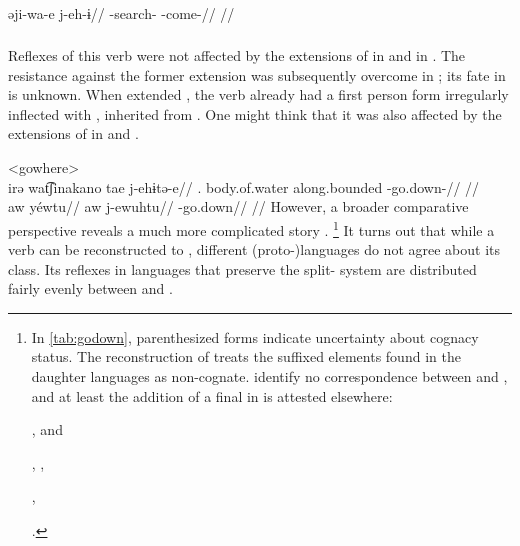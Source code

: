 \carijo \parencite[][102]{guerrero2019carijo}\\
\begingl
\gla əji-wa-e j-eh-ɨ//
\glb {}-search- -come-//
\glft {}//
\endgl
\xe

\subsubsection{ }
\label{sec:godown}
Reflexes of this verb were not affected by the extensions of  in \PPek {} and  in \akuriyo {}.
The resistance against the former extension was subsequently overcome in \bakairi; its fate in \ikpeng is unknown.
When \akuriyo extended , the verb already had a first person form irregularly inflected with , inherited from \PTir.
One might think that it was also affected by the extensions of  in \carijo {} and \yukpa {}.

\pex<gowhere>
 \carijo {}\\
\begingl
\gla irə wat͡ʃinakano tae j-ehɨtə-e//
\glb {}. body.of.water along.bounded -go.down-//
\glft {}//
\endgl
{} \yukpa \parencite[][]{meira2003primeras}\\
\begingl
\glpreamble aw yéwtu//
\gla aw j-ewuhtu//
\glb {} -go.down//
\glft {}//
\endgl
\xe
%
However, a broader comparative perspective reveals a much more complicated story .%
\footnote{In \cref{tab:godown}, parenthesized forms indicate uncertainty about cognacy status. The reconstruction of \PPek {} treats the suffixed elements found in the daughter languages as non-cognate.
\textcite{meira2005southern} identify no correspondence between \bakairi {} and \ikpeng {}, and at least the addition of a final  in \PXin is attested elsewhere:
		\begin{inlinelist}
			\item \PC {} , \arara and \ikpeng {} %
			\item \PC {} , \arara {}, \ikpeng {} %
			\item \PC {} , \arara {}  %
		\end{inlinelist} \parencites[8]{gildea2007greenberg}[56, 144, 57]{alves2017arara}[25, 270]{ikpengpacheco2001}.}
It turns out that while a verb can be reconstructed to \PC, different (proto-)languages do not agree about its class.
Its reflexes in languages that preserve the split- system are distributed fairly evenly between  and .

